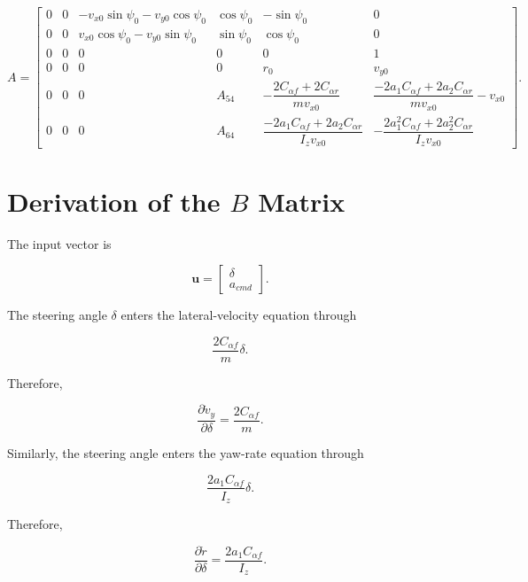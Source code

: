 \documentclass[12pt,a4paper]{article}
\begin{document}
\begin{equation}
\boxed{
A=
\begin{bmatrix}
0 &
0 &
-v_{x0}\sin\psi_0-v_{y0}\cos\psi_0 &
\cos\psi_0 &
-\sin\psi_0 &
0
\\[1mm]
0 &
0 &
v_{x0}\cos\psi_0-v_{y0}\sin\psi_0 &
\sin\psi_0 &
\cos\psi_0 &
0
\\[1mm]
0&0&0&0&0&1
\\[1mm]
0&0&0&0&r_0&v_{y0}
\\[1mm]
0&0&0&A_{54}&
-\dfrac{2C_{\alpha f}+2C_{\alpha r}}{mv_{x0}}&
\dfrac{-2a_1C_{\alpha f}+2a_2C_{\alpha r}}{mv_{x0}}
-v_{x0}
\\[4mm]
0&0&0&A_{64}&
\dfrac{-2a_1C_{\alpha f}+2a_2C_{\alpha r}}{I_zv_{x0}}&
-\dfrac{2a_1^2C_{\alpha f}+2a_2^2C_{\alpha r}}
{I_zv_{x0}}
\end{bmatrix}
}.
\end{equation}

\section{Derivation of the $B$ Matrix}

The input vector is

\begin{equation}
\bm{u}
=
\begin{bmatrix}
\delta\\
a_{cmd}
\end{bmatrix}.
\end{equation}

The steering angle $\delta$ enters the lateral-velocity equation through

\begin{equation}
\frac{2C_{\alpha f}}{m}\delta.
\end{equation}

Therefore,

\begin{equation}
\frac{\partial\dot v_y}{\partial\delta}
=
\frac{2C_{\alpha f}}{m}.
\end{equation}

Similarly, the steering angle enters the yaw-rate equation through

\begin{equation}
\frac{2a_1C_{\alpha f}}{I_z}\delta.
\end{equation}

Therefore,

\begin{equation}
\frac{\partial\dot r}{\partial\delta}
=
\frac{2a_1C_{\alpha f}}{I_z}.
\end{equation}
\end{document}
